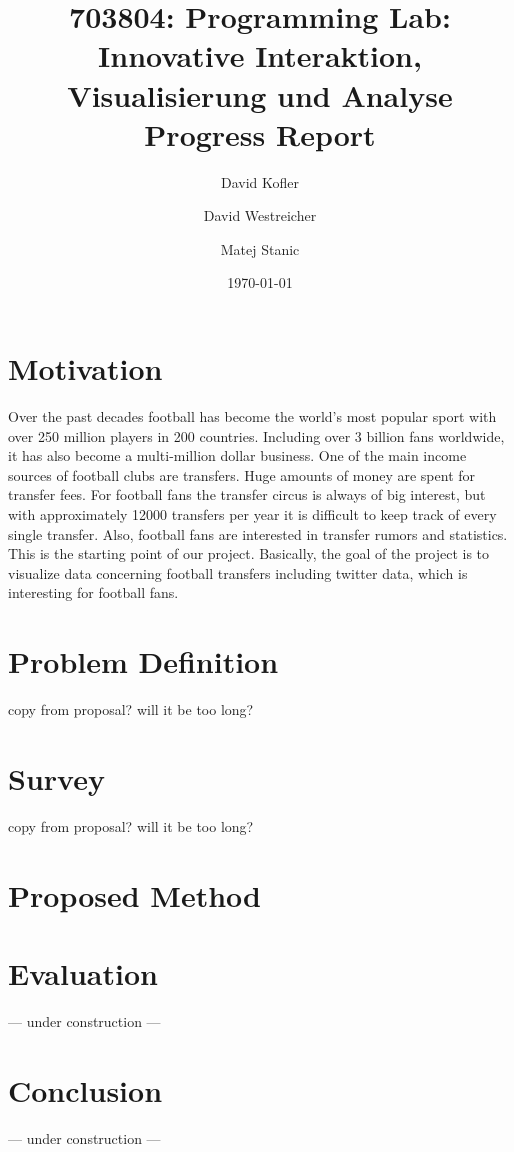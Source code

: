 \documentclass{article}
\begin{document}
\title{703804: Programming Lab: Innovative Interaktion,
Visualisierung und Analyse\\ Progress Report}
\author{David Kofler \and David Westreicher \and Matej Stanic}
\date{\today}
\maketitle

\section{Motivation}
Over the past decades football has become the world's most popular sport with over 250 million players in 200 countries. Including over 3 billion fans worldwide, it has also become a multi-million dollar business. One of the main income sources of football clubs are transfers. Huge amounts of money are spent for transfer fees. For football fans the transfer circus is always of big interest, but with approximately 12000 transfers per year it is difficult to keep track of every single transfer. Also, football fans are interested in transfer rumors and statistics. This is the starting point of our project. Basically, the goal of the project is to visualize data concerning football transfers including twitter data, which is interesting for football fans.

\section{Problem Definition}
copy from proposal? will it be too long?
\section{Survey}
copy from proposal? will it be too long?
\section{Proposed Method}
\section{Evaluation}
--- under construction ---
\section{Conclusion}
--- under construction ---


\end{document}
